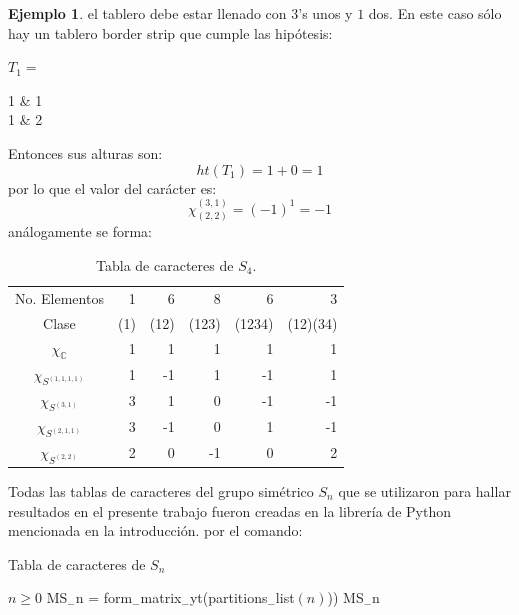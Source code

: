 \documentclass[12pt]{book}
\theoremstyle{definition}
\newtheorem{example}[theorem]{Ejemplo}
\newcounter{in}
\begin{document}
\begin{example}
el tablero debe estar llenado con $3$'s unos y $1$ dos. En este caso
sólo hay un tablero border strip que cumple las hipótesis:
\begin{center}  
  $T_1=$
  \begin{ytableau}
    1 & 1  \\
    1 & 2
  \end{ytableau}\qquad
\end{center}
Entonces sus alturas son:
$$ht(T_1) = 1 + 0 = 1$$
por lo que el valor del carácter es:
$$\chi_{(2,2)}^{(3,1)} = (-1)^{1} = -1$$
análogamente se forma:
\begin{table}[htpb]
  \centering
  \begin{tabular}{c|r r r r r}
    No. Elementos & 1 & 6 & 8 & 6 & 3 \\
    Clase & (1) & (12) & (123) & (1234) &(12)(34)\\
    \hline
    $\chi_{\mathbb{C}}$ & 1 & 1 & 1 & 1 & 1 \\
    $\chi_{S^{(1,1,1,1)}}$ & 1 & -1 & 1 & -1 & 1\\
    $\chi_{S^{(3,1)}}$ & 3 & 1 & 0 & -1 & -1\\
    $\chi_{S^{(2,1,1)}}$ & 3 & -1 & 0 & 1 & -1 \\
    $\chi_{S^{(2,2)}}$ & 2 & 0 & -1 & 0 & 2 
\end{tabular}
    \caption{Tabla de caracteres de $S_{4}$.}
\label{tab:S_4}
\end{table}
\end{example}
Todas las tablas de caracteres del grupo simétrico $S_n$ que se
utilizaron para hallar resultados en el presente trabajo fueron
creadas en la librería de Python mencionada en la introducción.
por el comando:
\begin{algorithm}[H]
\caption{Tabla de caracteres de $S_n$}
\begin{algorithmic}
\REQUIRE $n \geq 0$
\STATE MS$_{-}$n = form$_{-}$matrix$_{-}$yt(partitions$_{-}$list$(n)$))
\PRINT MS$_{-}$n
\end{algorithmic}
\end{algorithm}
\end{document}
